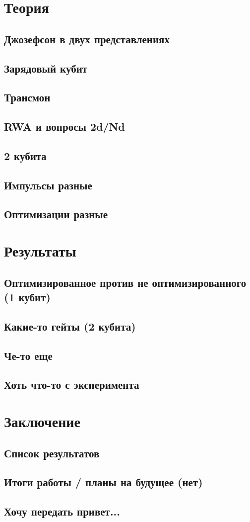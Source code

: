 \documentclass{article}
\begin{document}
\section{Теория}
\subsection{Джозефсон в двух представлениях}
\subsection{Зарядовый кубит}
\subsection{Трансмон}
\subsection{RWA и вопросы 2d/Nd}
\subsection{2 кубита}
\subsection{Импульсы разные}
\subsection{Оптимизации разные}
\section{Результаты}
\subsection{Оптимизированное против не оптимизированного (1 кубит)}
\subsection{Какие-то гейты (2 кубита)}
\subsection{Че-то еще}
\subsection{Хоть что-то с эксперимента}
\section{Заключение}
\subsection{Список результатов}
\subsection{Итоги работы / планы на будущее (нет)}
\subsection{Хочу передать привет...}
\end{document}

